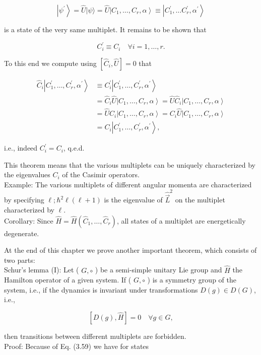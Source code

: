 \documentclass[10pt, letterpaper]{article}
\begin{document}
$$
\left|\psi^{\prime}\right\rangle=\hat{U}|\psi\rangle=\hat{U}\left|C_{1}, \ldots, C_{r}, \alpha\right\rangle \equiv\left|C_{1}^{\prime}, \ldots C_{r}^{\prime}, \alpha^{\prime}\right\rangle
$$

is a state of the very same multiplet. It remains to be shown that

$$
C_{i}^{\prime} \equiv C_{i} \quad \forall i=1, \ldots, r .
$$

To this end we compute using $\left[\hat{C}_{i}, \hat{U}\right]=0$ that

$$
\begin{aligned}
\hat{C}_{i}\left|C_{1}^{\prime}, \ldots, C_{r}^{\prime}, \alpha^{\prime}\right\rangle & \equiv C_{i}^{\prime}\left|C_{1}^{\prime}, \ldots, C_{r}^{\prime}, \alpha^{\prime}\right\rangle \\
& =\hat{C}_{i} \hat{U}\left|C_{1}, \ldots, C_{r}, \alpha\right\rangle=\hat{U} \hat{C}_{i}\left|C_{1}, \ldots, C_{r}, \alpha\right\rangle \\
& =\hat{U} C_{i}\left|C_{1}, \ldots, C_{r}, \alpha\right\rangle=C_{i} \hat{U}\left|C_{1}, \ldots, C_{r}, \alpha\right\rangle \\
& =C_{i}\left|C_{1}^{\prime}, \ldots, C_{r}^{\prime}, \alpha^{\prime}\right\rangle,
\end{aligned}
$$

i.e., indeed $C_{i}^{\prime}=C_{i}$, q.e.d.

This theorem means that the various multiplets can be uniquely characterized by the eigenvalues $C_{i}$ of the Casimir operators.\\
Example: The various multiplets of different angular momenta are characterized by specifying $\ell ; \hbar^{2} \ell(\ell+1)$ is the eigenvalue of $\hat{\vec{L}}^{2}$ on the multiplet characterized by $\ell$.\\
Corollary: Since $\hat{H}=\hat{H}\left(\hat{C}_{1}, \ldots, \hat{C}_{r}\right)$, all states of a multiplet are energetically degenerate.

At the end of this chapter we prove another important theorem, which consists of two parts:\\
Schur's lemma (I): Let ( $G, \circ$ ) be a semi-simple unitary Lie group and $\hat{H}$ the Hamilton operator of a given system. If ( $G, \circ$ ) is a symmetry group of the system, i.e., if the dynamics is invariant under transformations $D(g) \in D(G)$, i.e.,

$$
[D(g), \hat{H}]=0 \quad \forall g \in G,
$$

then transitions between different multiplets are forbidden.\\
Proof: Because of Eq. (3.59) we have for states
\end{document}
